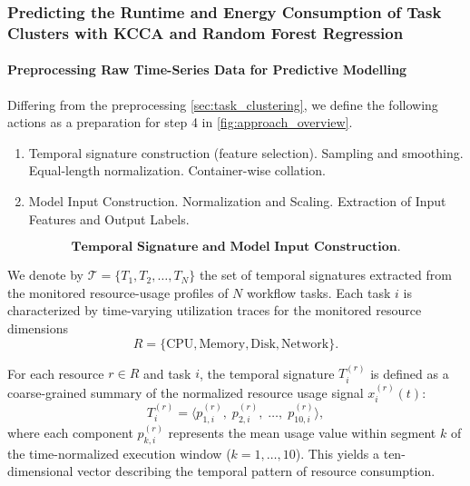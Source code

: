 \subsubsection{Predicting the Runtime and Energy Consumption of Task Clusters with KCCA and Random Forest Regression}
\label{sec:prediciton_kcca_rfr}

\paragraph{Preprocessing Raw Time-Series Data for Predictive Modelling}
\label{sec:data_preprocessing_predictive}

Differing from the preprocessing \ref{sec:task_clustering}, we define the following actions as a preparation for step 4 in \ref{fig:approach_overview}.


\begin{enumerate}
    \item Temporal signature construction (feature selection).
          \subitem Sampling and smoothing.
          \subitem Equal-length normalization.
          \subitem Container-wise collation.
    \item Model Input Construction.
          \subitem Normalization and Scaling.
          \subitem Extraction of Input Features and Output Labels.
\end{enumerate}


\[
    \textbf{Temporal Signature and Model Input Construction.}
\]

We denote by \( \mathcal{T} = \{ T_1, T_2, \dots, T_N \} \) the set of
temporal signatures extracted from the monitored resource-usage profiles
of \( N \) workflow tasks.
Each task \( i \) is characterized by time-varying utilization traces
for the monitored resource dimensions
\[
    R = \{ \text{CPU}, \text{Memory}, \text{Disk}, \text{Network} \}.
\]

\noindent
For each resource \( r \in R \) and task \( i \),
the temporal signature \( T_i^{(r)} \) is defined as a
coarse-grained summary of the normalized resource usage signal
\( x_i^{(r)}(t) \):
\[
    T_i^{(r)} =
    \bigl\langle
    p_{1,i}^{(r)},\;
    p_{2,i}^{(r)},\;
    \dots,\;
    p_{10,i}^{(r)}
    \bigr\rangle,
    \tag{1}
\]
where each component \( p_{k,i}^{(r)} \) represents the mean
usage value within segment \( k \) of the time-normalized
execution window (\( k = 1, \dots, 10 \)).
This yields a ten-dimensional vector describing the temporal pattern of
resource consumption.


